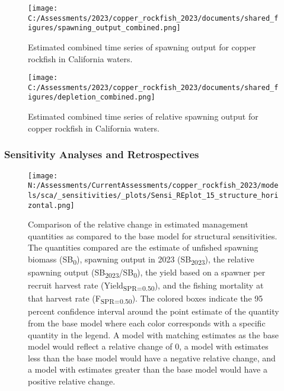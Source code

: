 \documentclass[11pt,
  english,
  letterpaper,
]{article}
\begin{document}
\pagebreak

\begin{figure}
\centering
\texttt{[image: C:/Assessments/2023/copper\_rockfish\_2023/documents/shared\_figures/spawning\_output\_combined.png]}
\caption{Estimated combined time series of spawning output for copper rockfish in California waters.\label{fig:sb-all}}
\end{figure}

\clearpage

\begin{figure}
\centering
\texttt{[image: C:/Assessments/2023/copper\_rockfish\_2023/documents/shared\_figures/depletion\_combined.png]}
\caption{Estimated combined time series of relative spawning output for copper rockfish in California waters.\label{fig:depl-all}}
\end{figure}

\clearpage

\hypertarget{sensitivity-analyses-and-retrospectives}{%
\subsubsection{Sensitivity Analyses and Retrospectives}\label{sensitivity-analyses-and-retrospectives}}

\begin{figure}
\centering
\texttt{[image: N:/Assessments/CurrentAssessments/copper\_rockfish\_2023/models/sca/\_sensitivities/\_plots/Sensi\_REplot\_15\_structure\_horizontal.png]}
\caption{Comparison of the relative change in estimated management quantities as compared to the base model for structural sensitivities. The quantities compared are the estimate of unfished spawning biomass (SB\textsubscript{0}), spawning output in 2023 (SB\textsubscript{2023}), the relative spawning output (SB\textsubscript{2023}/SB\textsubscript{0}), the yield based on a spawner per recruit harvest rate (Yield\textsubscript{SPR=0.50}), and the fishing mortality at that harvest rate (F\textsubscript{SPR=0.50}). The colored boxes indicate the 95 percent confidence interval around the point estimate of the quantity from the base model where each color corresponds with a specific quantity in the legend. A model with matching estimates as the base model would reflect a relative change of 0, a model with estimates less than the base model would have a negative relative change, and a model with estimates greater than the base model would have a positive relative change.\label{fig:sens-structure}}
\end{figure}
\end{document}
